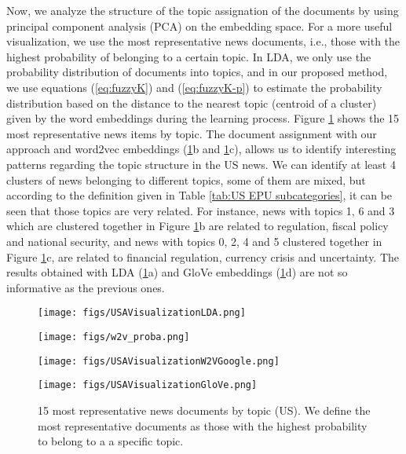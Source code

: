 \documentclass{article}
\begin{document}
Now, we analyze the structure of the topic assignation of the documents by using principal component analysis (PCA) on the embedding space. For a more useful visualization, we use the most representative news documents, i.e., those with the highest probability of belonging to a certain topic.  In LDA, we only use the probability distribution of documents into topics, and in our proposed method, we use equations (\ref{eq:fuzzyK}) and (\ref{eq:fuzzyK-p}) to estimate the probability distribution based on the distance to the nearest topic (centroid of a cluster) given by the word embeddings during the learning process. Figure \ref{fig:chap3.fig10} shows the 15 most representative news items by topic. The document assignment with our approach and word2vec embeddings (\ref{fig:chap3.fig10}b and \ref{fig:chap3.fig10}c), allows us to identify interesting patterns regarding the topic structure in the US news. We can identify at least 4 clusters of news belonging to different topics, some of them are mixed, but according to the definition given in Table \ref{tab:US EPU subcategories}, it can be seen that those topics are very related. For instance, news with topics 1, 6 and 3 which are clustered together in Figure \ref{fig:chap3.fig10}b are related to regulation, fiscal policy and national security, and news with topics 0, 2, 4 and 5 clustered together in Figure \ref{fig:chap3.fig10}c, are related to financial regulation, currency crisis and uncertainty. The results obtained with LDA (\ref{fig:chap3.fig10}a) and GloVe  embeddings (\ref{fig:chap3.fig10}d) are not so informative as the previous ones. 

\begin{figure}[H] 
  \begin{minipage}[b]{0.5\linewidth}
    \centering
  \centering
  \texttt{[image: figs/USAVisualizationLDA.png]}
  \centering \vspace{1ex}
  \end{minipage}
  \begin{minipage}[b]{0.5\linewidth}
    \centering
  \centering
  \texttt{[image: figs/w2v\_proba.png]}
  \centering \vspace{1ex}
  \end{minipage}
    \begin{minipage}[b]{0.5\linewidth}
    \centering
  \centering
  \texttt{[image: figs/USAVisualizationW2VGoogle.png]}
    \vspace{1ex}
  \end{minipage}
    \begin{minipage}[b]{0.5\linewidth}
    \centering
  \centering
  \texttt{[image: figs/USAVisualizationGloVe.png]}
    \vspace{1ex}
\end{minipage}

\caption{15 most representative news documents by topic (US). We define the most representative documents as those with the highest probability to belong to a a specific topic.}
    \label{fig:chap3.fig10}
\end{figure}
\end{document}
